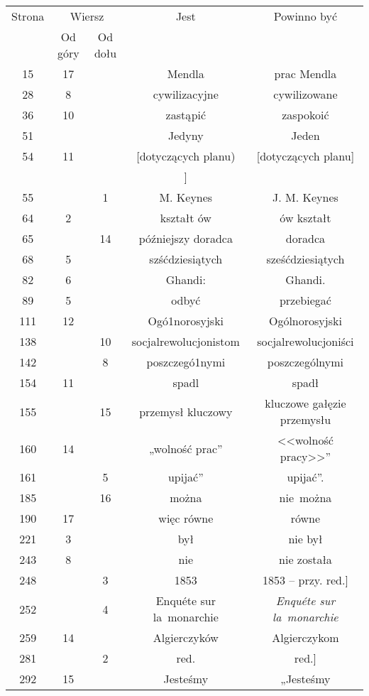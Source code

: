 \documentclass[a4paper,11pt]{article}
\numberwithin{equation}{section}
\begin{document}
\begin{center}

  \begin{tabular}{|c|c|c|c|c|}
    \hline
    Strona & \multicolumn{2}{c|}{Wiersz} & Jest
                              & Powinno być \\ \cline{2-3}
    & Od góry & Od dołu & & \\
    \hline
    15  & 17 & & Mendla & prac Mendla \\
    28  &  8 & & cywilizacyjne & cywilizowane \\
    36  & 10 & & zastąpić & zaspokoić \\
    51  & & & Jedyny & Jeden \\ %
    54  & 11 & & [dotyczących planu) & [dotyczących planu] \\
    & & & ] & \\
    55  & &  1 & M. Keynes & J. M. Keynes \\
    64  &  2 & & kształt ów & ów kształt \\
    65  & & 14 & późniejszy doradca & doradca \\
    68  &  5 & & szśćdziesiątych & sześćdziesiątych \\
    82  &  6 & & Ghandi: & Ghandi. \\
    89  &  5 & & odbyć & przebiegać \\
    111 & 12 & & Ogó1norosyjski & Ogólnorosyjski \\
    138 & & 10 & socjalrewolucjonistom & socjalrewolucjoniści \\
    142 & &  8 & poszczegó1nymi & poszczególnymi \\
    154 & 11 & & spadl & spadł \\
    155 & & 15 & przemysł kluczowy & kluczowe gałęzie przemysłu \\
    160 & 14 & & „wolność prac” & <<wolność pracy>>” \\
    161 & &  5 & upijać” & upijać”. \\
    185 & & 16 & można & nie~można \\
    190 & 17 & & więc równe & równe \\
    221 &  3 & & był & nie był \\
    243 &  8 & & nie & nie została \\
    248 & &  3 & 1853 & 1853 -- przy. red.] \\
    252 & &  4 & Enqu\'{e}te sur la~monarchie
           & \textit{Enqu\'{e}te sur la~monarchie} \\
    259 & 14 & & Algierczyków & Algierczykom \\
    281 & &  2 & red. & red.] \\
    292 & 15 & & Jesteśmy & „Jesteśmy \\
    \hline
  \end{tabular}






\end{center}
\end{document}
